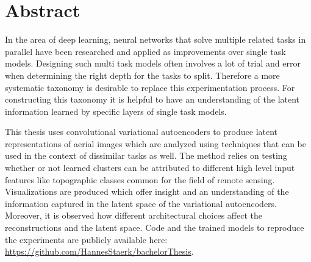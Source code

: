 \section{Abstract}


In the area of deep learning, neural networks that solve multiple related tasks in parallel have been
researched and applied as improvements over single task models. Designing such multi task
models often involves a lot of trial and error when determining the right depth for the tasks
to split. Therefore a more systematic taxonomy is desirable to replace this experimentation process.
For constructing this taxonomy it is helpful to have an understanding of the latent information 
learned by specific layers of single task models.

This thesis uses convolutional variational autoencoders to produce latent representations of 
aerial images which are analyzed using techniques that can be used in the context of dissimilar
tasks as well. The method relies on testing whether or not learned clusters can be attributed to
different high level input features like topographic classes common for the field
of remote sensing. Visualizations are produced which offer insight and an understanding of the
information captured in the latent space of the variational autoencoders.
Moreover, it is observed how different architectural choices affect the reconstructions and the
latent space.
Code and the trained models to reproduce the experiments are publicly available here:
\href{https://github.com/HannesStaerk/bachelorThesis}{https://github.com/HannesStaerk/bachelorThesis}.




